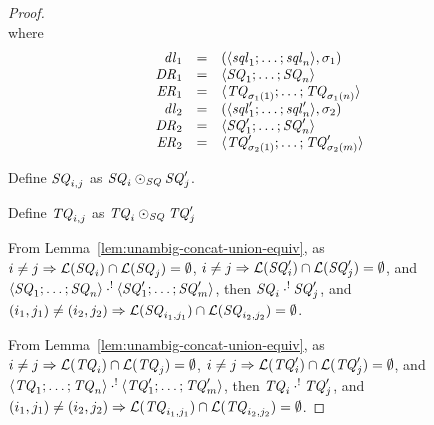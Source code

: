 \documentclass[numbers,10pt,preprint\ifanon ,nocopyrightspace\fi]{sigplanconf}
\begin{document}
\begin{proof}
\[{    }
  \]
  where
  \[
    \begin{array}{rcl}
      \mathit{dl}_1 & = &
                       (\langle\mathit{sql}_1;\ldots;\mathit{sql}_n\rangle,\sigma_1)\\
      \mathit{DR}_1 & = &
                        \langle\mathit{SQ}_1;\ldots;\mathit{SQ}_n\rangle\\
      \mathit{ER}_1 & = &
                           \langle\mathit{TQ}_{\sigma_1(1)};\ldots;\mathit{TQ}_{\sigma_1(n)}\rangle\\
      \mathit{dl}_2 & = &
                            (\langle\mathit{sql}_1';\ldots;\mathit{sql}_n'\rangle,\sigma_2)\\
      \mathit{DR}_2 & = &
                        \langle\mathit{SQ}_1';\ldots;\mathit{SQ}_n'\rangle\\
      \mathit{ER}_2 & = &
                           \langle\mathit{TQ}_{\sigma_2(1)}';\ldots;\mathit{TQ}_{\sigma_2(m)}'\rangle
    \end{array}
  \]
  
  Define $\mathit{SQ}_{i,j}$ as $\mathit{SQ}_i \odot_{\mathit{SQ}} \mathit{SQ}_j'$.

  Define $\mathit{TQ}_{i,j}$ as $\mathit{TQ}_i \odot_{\mathit{SQ}}
  \mathit{TQ}_j'$

  From Lemma~\ref{lem:unambig-concat-union-equiv}, as
  $i \neq j \Rightarrow \mathcal{L}(\mathit{SQ}_i) \cap
  \mathcal{L}(\mathit{SQ}_j) = \emptyset$,
  $i \neq j \Rightarrow \mathcal{L}(\mathit{SQ}_i') \cap
  \mathcal{L}(\mathit{SQ}_j') = \emptyset$,
  and
  $\langle\mathit{SQ}_1;\ldots;\mathit{SQ}_n\rangle \cdot^! \langle\mathit{SQ}_1';\ldots;\mathit{SQ}_m'\rangle$,
  then $\mathit{SQ}_i \cdot^! \mathit{SQ}_j'$,
  and $(i_1,j_1) \neq (i_2,j_2) \Rightarrow \mathcal{L}(\mathit{SQ}_{i_1,j_1})
  \cap \mathcal{L}(\mathit{SQ}_{i_2,j_2}) = \emptyset$.

  From Lemma~\ref{lem:unambig-concat-union-equiv}, as
  $i \neq j \Rightarrow \mathcal{L}(\mathit{TQ}_i) \cap
  \mathcal{L}(\mathit{TQ}_j) = \emptyset$,
  $i \neq j \Rightarrow \mathcal{L}(\mathit{TQ}_i') \cap
  \mathcal{L}(\mathit{TQ}_j') = \emptyset$,
  and
  $\langle\mathit{TQ}_1;\ldots;\mathit{TQ}_n\rangle \cdot^! \langle\mathit{TQ}_1';\ldots;\mathit{TQ}_m'\rangle$,
  then $\mathit{TQ}_i \cdot^! \mathit{TQ}_j'$,
  and $(i_1,j_1) \neq (i_2,j_2) \Rightarrow \mathcal{L}(\mathit{TQ}_{i_1,j_1})
  \cap \mathcal{L}(\mathit{TQ}_{i_2,j_2}) = \emptyset$.


\end{proof}
\end{document}
